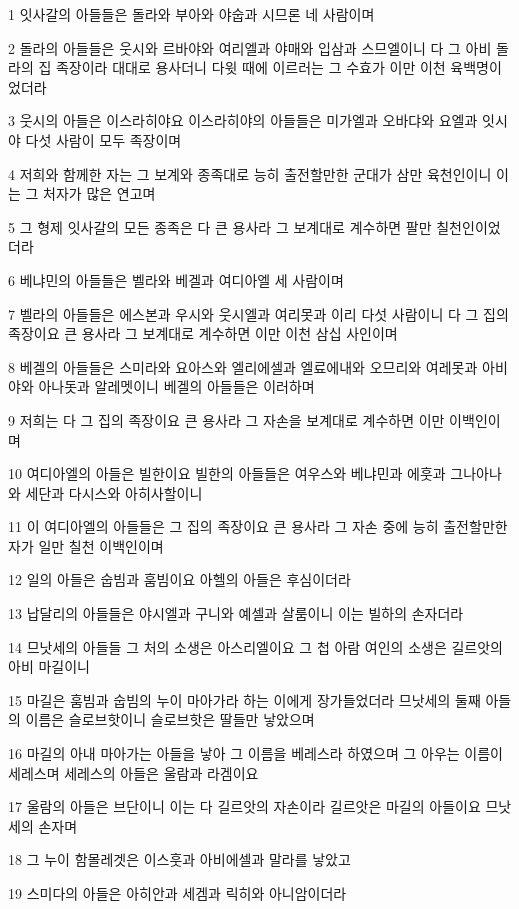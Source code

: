 \par 1 잇사갈의 아들들은 돌라와 부아와 야숩과 시므론 네 사람이며
\par 2 돌라의 아들들은 웃시와 르바야와 여리엘과 야매와 입삼과 스므엘이니 다 그 아비 돌라의 집 족장이라 대대로 용사더니 다윗 때에 이르러는 그 수효가 이만 이천 육백명이었더라
\par 3 웃시의 아들은 이스라히야요 이스라히야의 아들들은 미가엘과 오바댜와 요엘과 잇시야 다섯 사람이 모두 족장이며
\par 4 저희와 함께한 자는 그 보계와 종족대로 능히 출전할만한 군대가 삼만 육천인이니 이는 그 처자가 많은 연고며
\par 5 그 형제 잇사갈의 모든 종족은 다 큰 용사라 그 보계대로 계수하면 팔만 칠천인이었더라
\par 6 베냐민의 아들들은 벨라와 베겔과 여디아엘 세 사람이며
\par 7 벨라의 아들들은 에스본과 우시와 웃시엘과 여리못과 이리 다섯 사람이니 다 그 집의 족장이요 큰 용사라 그 보계대로 계수하면 이만 이천 삼십 사인이며
\par 8 베겔의 아들들은 스미라와 요아스와 엘리에셀과 엘료에내와 오므리와 여레못과 아비야와 아나돗과 알레멧이니 베겔의 아들들은 이러하며
\par 9 저희는 다 그 집의 족장이요 큰 용사라 그 자손을 보계대로 계수하면 이만 이백인이며
\par 10 여디아엘의 아들은 빌한이요 빌한의 아들들은 여우스와 베냐민과 에훗과 그나아나와 세단과 다시스와 아히사할이니
\par 11 이 여디아엘의 아들들은 그 집의 족장이요 큰 용사라 그 자손 중에 능히 출전할만한 자가 일만 칠천 이백인이며
\par 12 일의 아들은 숩빔과 훔빔이요 아헬의 아들은 후심이더라
\par 13 납달리의 아들들은 야시엘과 구니와 예셀과 살룸이니 이는 빌하의 손자더라
\par 14 므낫세의 아들들 그 처의 소생은 아스리엘이요 그 첩 아람 여인의 소생은 길르앗의 아비 마길이니
\par 15 마길은 훔빔과 숩빔의 누이 마아가라 하는 이에게 장가들었더라 므낫세의 둘째 아들의 이름은 슬로브핫이니 슬로브핫은 딸들만 낳았으며
\par 16 마길의 아내 마아가는 아들을 낳아 그 이름을 베레스라 하였으며 그 아우는 이름이 세레스며 세레스의 아들은 울람과 라겜이요
\par 17 울람의 아들은 브단이니 이는 다 길르앗의 자손이라 길르앗은 마길의 아들이요 므낫세의 손자며
\par 18 그 누이 함몰레겟은 이스훗과 아비에셀과 말라를 낳았고
\par 19 스미다의 아들은 아히안과 세겜과 릭히와 아니암이더라
